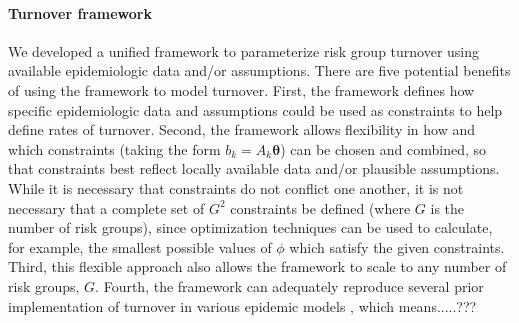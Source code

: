 \paragraph{Turnover framework}
We developed a unified framework 
to parameterize risk group turnover
using available epidemiologic data and/or assumptions.
There are five potential benefits of using the framework to model turnover.
First, the framework defines how specific epidemiologic data and assumptions
could be used as constraints to help define rates of turnover.
Second, the framework allows flexibility in how and which
constraints (taking the form $b_k = A_k \bm{\theta}$)
can be chosen and combined, so that constraints best reflect
locally available data and/or plausible assumptions.
While it is necessary that constraints do not conflict one another,
it is not necessary that a complete set of $G^2$ constraints be defined
(where $G$ is the number of risk groups),
since optimization techniques can be used to calculate, for example,
the smallest possible values of $\phi$ which satisfy the given constraints. %
Third, this flexible approach also allows the framework to scale
to any number of risk groups, $G$.
Fourth, the framework can adequately reproduce 
several prior implementation of 
turnover in various epidemic models \citep{Stigum1994,Eaton2014,Henry2015}, 	%
which means.....??? %


